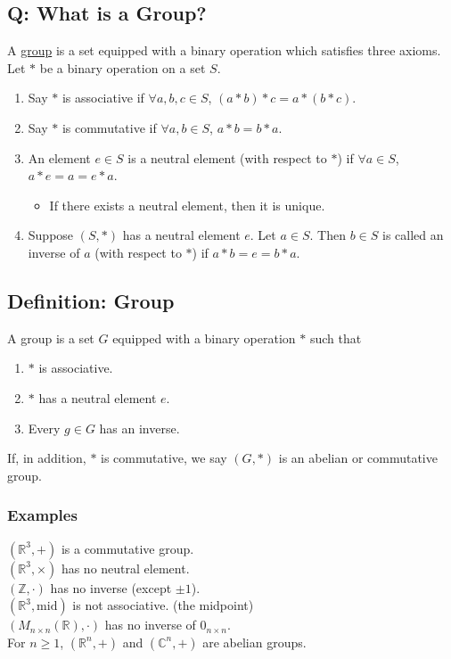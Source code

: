 \documentclass[11pt]{article}
\newcommand{\0}{\emptyset}
\newcommand{\Z}{\mathbb{Z}}
\newcommand{\R}{\mathbb{R}}
\newcommand{\C}{\mathbb{C}}
\begin{document}
\subsection*{Q: What is a Group?}
\label{sec:orgb1446db}
A \href{../Definitions/group.org}{group} is a set equipped with a binary operation which satisfies three axioms.\\[0pt]
Let \(*\) be a binary operation on a set \(S\).\\[0pt]
\begin{enumerate}
\item Say \(*\) is associative if \(\forall a,b,c\in S\), \((a*b)*c=a*(b*c)\).\\[0pt]
\item Say \(*\) is commutative if \(\forall a,b\in S\), \(a*b=b*a\).\\[0pt]
\item An element \(e\in S\) is a neutral element (with respect to \(*\)) if \(\forall a\in S\), \(a*e=a=e*a\).\\[0pt]
\begin{itemize}
\item If there exists a neutral element, then it is unique.\\[0pt]
\end{itemize}
\item Suppose \((S,*)\) has a neutral element \(e\). Let \(a\in S\). Then \(b\in S\) is called an inverse of \(a\) (with respect to \(*\)) if \(a*b=e=b*a\).\\[0pt]
\end{enumerate}
\subsection*{Definition: Group}
\label{sec:org9bb5d86}
A group is a set \(G\) equipped with a binary operation \(*\) such that\\[0pt]
\begin{enumerate}
\item \(*\) is associative.\\[0pt]
\item \(*\) has a neutral element \(e\).\\[0pt]
\item Every \(g\in G\) has an inverse.\\[0pt]
\end{enumerate}
If, in addition, \(*\) is commutative, we say \((G,*)\) is an abelian or commutative group.\\[0pt]
\subsubsection*{Examples}
\label{sec:org551d479}
\((\R^{3},+)\) is a commutative group.\\[0pt]
\((\R^{3},\times)\) has no neutral element.\\[0pt]
\((\Z,\cdot)\) has no inverse (except \(\pm 1\)).\\[0pt]
\((\R^{3},\text{mid})\) is not associative. (the midpoint)\\[0pt]
\((M_{n\times n}(\R),\cdot)\) has no inverse of \(0_{n\times n}\).\\[0pt]
For \(n\geq 1\), \((\R^{n},+)\) and \((\C^{n},+)\) are abelian groups.\\[0pt]
\end{document}

